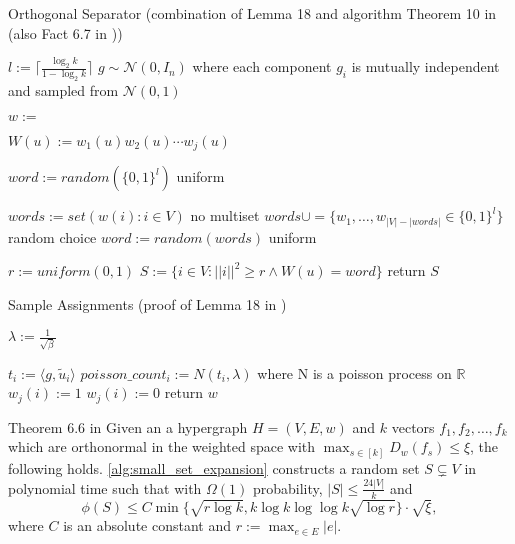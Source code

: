 \begin{algorithm}[h!]
	\caption{Orthogonal Separator (combination of Lemma 18 and algorithm Theorem 10 in \cite{LouisM14} (also Fact 6.7 in \cite{ChanLTZ16})) \label{alg:orthogonal_separator}} 
\begin{algorithmic}
	\State $l := \lceil \frac{\log_2 k}{1-\log_2 k}\rceil$
	\State $g \sim \mathcal{N} (0,I_n)$ where each component $g_i$ is mutually independent and sampled from $\mathcal{N} (0,1)$
	

	
	\State $w := $
	
	\State $W(u) := w_1(u)w_2(u)\cdots w_j(u)$
	\EndFor
	
	\State $word := random( \{0,1\}^l)$ uniform
	
	\Else
	 
	\State $words := set({w(i): i\in V})$  no multiset
	\State $words \cup= \{w_1, \ldots , w_{|V|-|words|} \in \{0,1\}^l\} $ random choice
	\State $word := random(words)$ uniform
	
	\EndIf
	
	\State $r := uniform(0,1)$
	\State $S := \{i \in V: ||i||^2 \ge r \land W(u) = word \}$
	\State return $S$
	
	\EndFunction %
\end{algorithmic}
\end{algorithm}	

	
	
\begin{algorithm}[h!]
	\caption{Sample Assignments (proof of Lemma 18 in \cite{LouisM14}) \label{alg:sample_assignments}} 
	\begin{algorithmic}
		\State $\lambda := \frac{1}{\sqrt{\beta}}$ 
	
	
	\State $t_i := \langle g, \tilde{u}_i \rangle $
	\State $poisson\_count_i := N(t_i, \lambda)$ where N is a poisson process on $\mathbb{R}$
	\State $w_j(i) := 1$
	\Else
	\State  $w_j(i) := 0$
	\EndIf
	\EndFor
	\EndFor
	\State return $w$
	\EndFunction %
\end{algorithmic}
\end{algorithm}	
\begin{fact}{Theorem 6.6 in \cite{ChanLTZ16}}
	Given an a hypergraph $H = (V, E, w)$ and $k$ vectors $f_1, f_2, \ldots , f_k$ which are orthonormal in the weighted space with $ \max_{s \in [k]} D_w(f_s) \le \xi $, the following holds. \cref{alg:small_set_expansion} constructs a random set $S \subsetneq V$ in polynomial time such that with $\Omega(1)$ probability, $|S| \le \frac{24|V|}{k}$ and
	 $$\phi(S) \le C \min\{\sqrt{r \log k}, k \log k  \log \log k \sqrt{\log r} \} \cdot \sqrt{\xi},$$ 
	 where $C$ is an absolute constant and $r := \max_{e\in E} |e|$.
\end{fact}

